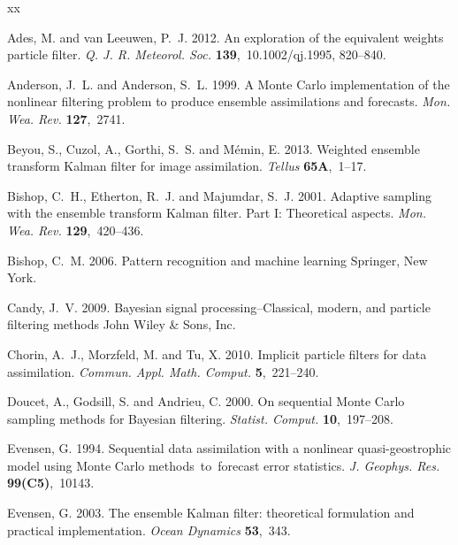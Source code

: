 \documentclass[useAMS,usenatbib]{tellus}
\begin{document}
\begin{thebibliography}{xx}

Ades, M. and van Leeuwen, P.~J. 2012. {An exploration of the equivalent weights
  particle filter}. {\em Q. J. R. Meteorol. Soc.} {\bf 139},~10.1002/qj.1995,
  820--840.

Anderson, J.~L. and Anderson, S.~L. 1999. {A Monte Carlo implementation of the
  nonlinear filtering problem to produce ensemble assimilations and forecasts}.
  {\em Mon. Wea. Rev.} {\bf 127},~2741.

Beyou, S., Cuzol, A., Gorthi, S.~S. and M{\'e}min, E. 2013. {Weighted ensemble
  transform Kalman filter for image assimilation}. {\em {Tellus}} {\bf
  65A},~1--17.

Bishop, C.~H., Etherton, R.~J. and Majumdar, S.~J. 2001. {Adaptive sampling
  with the ensemble transform Kalman filter. Part I: Theoretical aspects}. {\em
  Mon. Wea. Rev.} {\bf 129},~420--436.

Bishop, C.~M. 2006. {Pattern recognition and machine learning} {Springer, New
  York}.

Candy, J.~V. 2009. {Bayesian signal processing--Classical, modern, and particle
  filtering methods} {John Wiley \& Sons, Inc.}

Chorin, A.~J., Morzfeld, M. and Tu, X. 2010. {Implicit particle filters for
  data assimilation}. {\em {Commun. Appl. Math. Comput.}} {\bf 5},~221--240.

Doucet, A., Godsill, S. and Andrieu, C. 2000. {On sequential Monte Carlo
  sampling methods for Bayesian filtering}. {\em {Statist. Comput.}} {\bf
  10},~197--208.

Evensen, G. 1994. {Sequential data assimilation with a nonlinear
  quasi-geostrophic model using Monte Carlo methods~to~forecast error
  statistics}. {\em J. Geophys. Res.} {\bf 99(C5)},~10143.

Evensen, G. 2003. {The ensemble Kalman filter: theoretical formulation and
  practical implementation}. {\em {Ocean Dynamics}} {\bf 53},~343.


\end{thebibliography}
\end{document}
